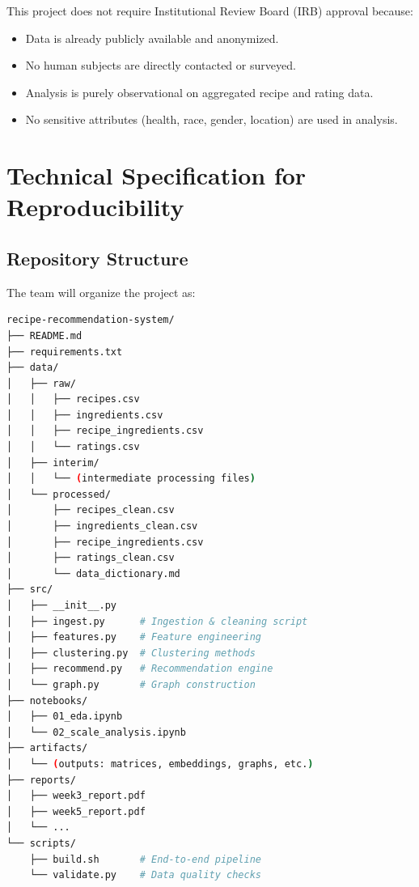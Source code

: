 \documentclass[11pt,a4paper]{article}
\begin{document}
This project does not require Institutional Review Board (IRB) approval because:

\begin{itemize}
    \item Data is already publicly available and anonymized.
    \item No human subjects are directly contacted or surveyed.
    \item Analysis is purely observational on aggregated recipe and rating data.
    \item No sensitive attributes (health, race, gender, location) are used in analysis.
\end{itemize}

\newpage

\section{Technical Specification for Reproducibility}

\subsection{Repository Structure}

The team will organize the project as:

\begin{lstlisting}[language=bash]
recipe-recommendation-system/
├── README.md
├── requirements.txt
├── data/
│   ├── raw/
│   │   ├── recipes.csv
│   │   ├── ingredients.csv
│   │   ├── recipe_ingredients.csv
│   │   └── ratings.csv
│   ├── interim/
│   │   └── (intermediate processing files)
│   └── processed/
│       ├── recipes_clean.csv
│       ├── ingredients_clean.csv
│       ├── recipe_ingredients.csv
│       ├── ratings_clean.csv
│       └── data_dictionary.md
├── src/
│   ├── __init__.py
│   ├── ingest.py      # Ingestion & cleaning script
│   ├── features.py    # Feature engineering
│   ├── clustering.py  # Clustering methods
│   ├── recommend.py   # Recommendation engine
│   └── graph.py       # Graph construction
├── notebooks/
│   ├── 01_eda.ipynb
│   └── 02_scale_analysis.ipynb
├── artifacts/
│   └── (outputs: matrices, embeddings, graphs, etc.)
├── reports/
│   ├── week3_report.pdf
│   ├── week5_report.pdf
│   └── ...
└── scripts/
    ├── build.sh       # End-to-end pipeline
    └── validate.py    # Data quality checks
\end{lstlisting}
\end{document}
